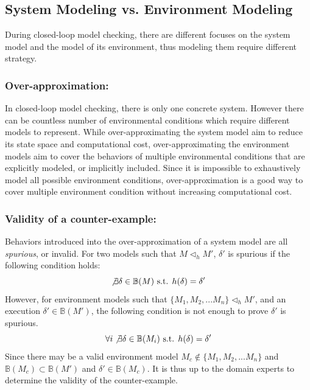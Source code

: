 \subsection{System Modeling vs. Environment Modeling}
During closed-loop model checking, there are different focuses on the system model and the model of its environment, thus modeling them require different strategy.
\subsubsection{Over-approximation: }In closed-loop model checking, there is only one concrete system. However there can be countless number of environmental conditions which require different models to represent. While over-approximating the system model aim to reduce its state space and computational cost, over-approximating the environment models aim to cover the behaviors of multiple environmental conditions that are explicitly modeled, or implicitly included. Since it is impossible to exhaustively model all possible environment conditions, over-approximation is a good way to cover multiple environment condition without increasing computational cost. %

\subsubsection{Validity of a counter-example: }Behaviors introduced into the over-approximation of a system model are all \emph{spurious}, or invalid. For two models such that $M\triangleleft_h M'$, $\delta'$ is spurious if the following condition holds: 
$$\not\exists \delta\in\mathbb{B}(M) \text{ s.t. }h(\delta)=\delta'$$
However, for environment models such that $\{M_1,M_2,...M_n\}\triangleleft_h M'$, and an execution $\delta'\in\mathbb{B}(M')$, the following condition is not enough to prove $\delta'$ is spurious.
$$\forall i\not\exists \delta\in\mathbb{B}(M_i)\text{ s.t. }h(\delta)=\delta'$$
Since there may be a valid environment model $M_c\not\in\{M_1,M_2,...M_n\}$ and $\mathbb{B}(M_c)\subset\mathbb{B}(M')$ and $\delta'\in\mathbb{B}(M_c)$. It is thus up to the domain experts to determine the validity of the counter-example.

